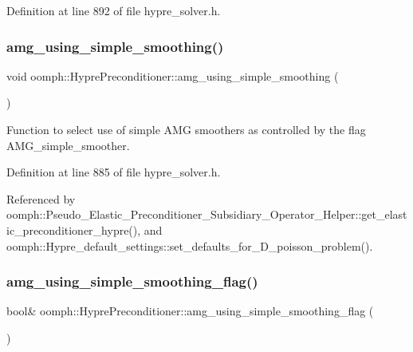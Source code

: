 Definition at line 892 of file hypre\+\_\+solver.\+h.

\mbox{\label{classoomph_1_1HyprePreconditioner_a7d4e9b31759555c67d51c0418de2980e}} 
\subsubsection{\texorpdfstring{amg\+\_\+using\+\_\+simple\+\_\+smoothing()}{amg\_using\_simple\_smoothing()}}
{\footnotesize\ttfamily void oomph\+::\+Hypre\+Preconditioner\+::amg\+\_\+using\+\_\+simple\+\_\+smoothing (\begin{DoxyParamCaption}{ }\end{DoxyParamCaption})\hspace{0.3cm}{\ttfamily [inline]}}



Function to select use of \textquotesingle{}simple\textquotesingle{} A\+MG smoothers as controlled by the flag A\+M\+G\+\_\+simple\+\_\+smoother. 



Definition at line 885 of file hypre\+\_\+solver.\+h.



Referenced by oomph\+::\+Pseudo\+\_\+\+Elastic\+\_\+\+Preconditioner\+\_\+\+Subsidiary\+\_\+\+Operator\+\_\+\+Helper\+::get\+\_\+elastic\+\_\+preconditioner\+\_\+hypre(), and oomph\+::\+Hypre\+\_\+default\+\_\+settings\+::set\+\_\+defaults\+\_\+for\+\_\+D\+\_\+poisson\+\_\+problem().

\mbox{\label{classoomph_1_1HyprePreconditioner_a7d849ee9489020e7a58bec0f5d33700e}} 
\subsubsection{\texorpdfstring{amg\+\_\+using\+\_\+simple\+\_\+smoothing\+\_\+flag()}{amg\_using\_simple\_smoothing\_flag()}}
{\footnotesize\ttfamily bool\& oomph\+::\+Hypre\+Preconditioner\+::amg\+\_\+using\+\_\+simple\+\_\+smoothing\+\_\+flag (\begin{DoxyParamCaption}{ }\end{DoxyParamCaption})\hspace{0.3cm}{\ttfamily [inline]}}



